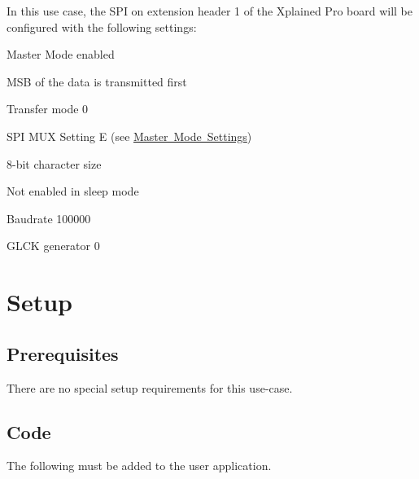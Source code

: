 In this use case, the S\+PI on extension header 1 of the Xplained Pro board will be configured with the following settings\+:
\begin{DoxyItemize}
\item Master Mode enabled
\item M\+SB of the data is transmitted first
\item Transfer mode 0
\item S\+PI M\+UX Setting E (see \mbox{\hyperlink{asfdoc_sam0_sercom_spi_mux_settings_asfdoc_sam0_sercom_spi_mux_settings_master}{Master Mode Settings}})
\item 8-\/bit character size
\item Not enabled in sleep mode
\item Baudrate 100000
\item G\+L\+CK generator 0
\end{DoxyItemize}\hypertarget{asfdoc_sam0_sercom_spi_master_callback_use_asfdoc_sam0_sercom_spi_master_callback_use_setup}{}\section{Setup}\label{asfdoc_sam0_sercom_spi_master_callback_use_asfdoc_sam0_sercom_spi_master_callback_use_setup}
\hypertarget{asfdoc_sam0_sercom_spi_master_callback_use_asfdoc_sam0_sercom_spi_master_callback_use_prereq}{}\subsection{Prerequisites}\label{asfdoc_sam0_sercom_spi_master_callback_use_asfdoc_sam0_sercom_spi_master_callback_use_prereq}
There are no special setup requirements for this use-\/case.\hypertarget{asfdoc_sam0_sercom_spi_master_callback_use_asfdoc_sam0_sercom_spi_master_callback_use_setup_code}{}\subsection{Code}\label{asfdoc_sam0_sercom_spi_master_callback_use_asfdoc_sam0_sercom_spi_master_callback_use_setup_code}
The following must be added to the user application.

